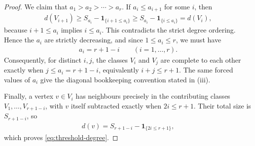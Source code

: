 \documentclass[10pt,a4paper]{article}
\newcommand{\ind}{\mathbf 1}
\begin{document}
\begin{proof}
We claim that $a_1>a_2>\cdots>a_r$.  If $a_i\le a_{i+1}$ for some $i$, then
\begin{align*}
  d(V_{i+1})\ge S_{a_i}-\ind_{\{i+1\le a_i\}}
  \ge S_{a_i}-\ind_{\{i\le a_i\}}=d(V_i),
\end{align*}
because $i+1\le a_i$ implies $i\le a_i$.  This contradicts the strict degree
ordering.  Hence the $a_i$ are strictly decreasing, and since
$1\le a_i\le r$, we must have
\begin{align*}
  a_i=r+1-i\qquad (i=1,\ldots,r).
\end{align*}
Consequently, for distinct $i,j$, the classes $V_i$ and $V_j$ are complete to
each other exactly when $j\le a_i=r+1-i$, equivalently $i+j\le r+1$.  The same
forced values of $a_i$ give the diagonal bookkeeping convention stated in
(iii).

Finally, a vertex $v\in V_i$ has neighbours precisely in the contributing
classes $V_1,\ldots,V_{r+1-i}$, with $v$ itself subtracted exactly when
$2i\le r+1$.  Their total size is $S_{r+1-i}$, so
\begin{align*}
  d(v)=S_{r+1-i}-\ind_{\{2i\le r+1\}},
\end{align*}
which proves \eqref{eq:threshold-degree}.




















\end{proof}
\end{document}
